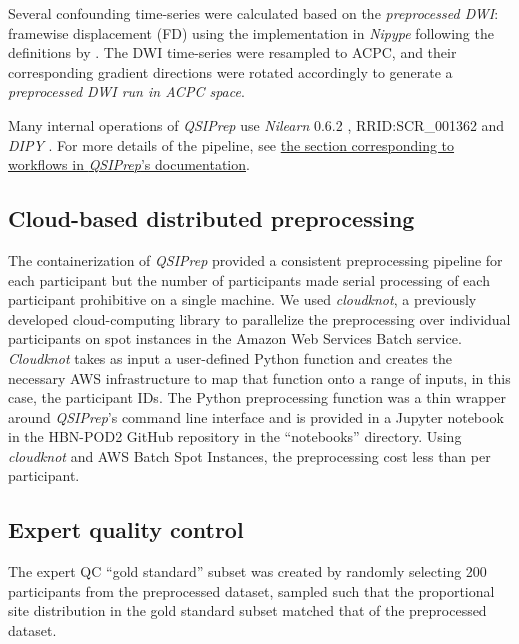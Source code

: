 \documentclass[9pt,lineno]{elife}
\begin{document}
\begin{itemize}
Several confounding time-series were calculated based on the
\emph{preprocessed DWI}: framewise displacement (FD) using the implementation
in \emph{Nipype} following the definitions by \citep{power-fd-dvars}. The DWI
time-series were resampled to ACPC, and their corresponding gradient directions
were rotated accordingly to generate a \emph{preprocessed DWI run
in ACPC space}. 

\end{itemize}

Many internal operations of \emph{QSIPrep} use \emph{Nilearn} 0.6.2
\citep{nilearn}, RRID:SCR\_001362 and \emph{DIPY} \citep{dipy}. For more details
of the pipeline, see
\href{https://qsiprep.readthedocs.io/en/latest/workflows.html}{the section
corresponding to workflows in \emph{QSIPrep}'s documentation}.

\subsection{Cloud-based distributed preprocessing}

The containerization of \emph{QSIPrep} provided a consistent preprocessing
pipeline for each participant but the number of participants made serial processing of
each participant prohibitive on a single machine. We used \emph{cloudknot}, a
previously developed cloud-computing library \citep{cloudknot} to
parallelize the preprocessing over individual participants on spot instances in the
Amazon Web Services Batch service. \emph{Cloudknot} takes as input a
user-defined Python function and creates the necessary AWS infrastructure to map
that function onto a range of inputs, in this case, the participant IDs. The Python
preprocessing function was a thin wrapper around \emph{QSIPrep}'s command line
interface and is provided in a Jupyter notebook in the HBN-POD2 GitHub
repository in the ``notebooks'' directory. Using \emph{cloudknot} and AWS Batch
Spot Instances, the preprocessing cost less than  per participant.

\subsection{Expert quality control}

The expert QC ``gold standard'' subset was created by randomly selecting 200
participants from the preprocessed dataset, sampled such that the proportional site
distribution in the gold standard subset matched that of the preprocessed
dataset.
\end{document}
